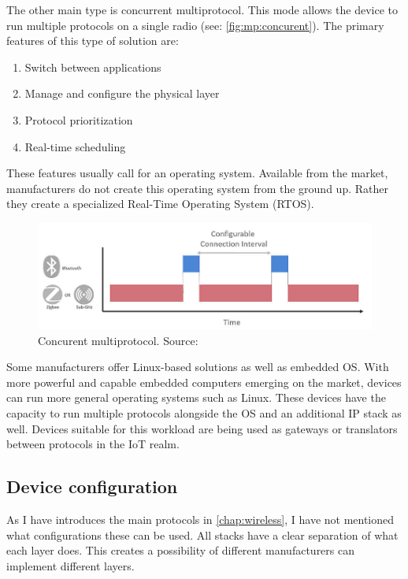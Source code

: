 The other main type is concurrent multiprotocol. This mode allows the device to run multiple protocols on a single radio (see: \autoref{fig:mp:concurent}). The primary features of this type of solution are:
\begin{enumerate}
    \item Switch between applications
    \item Manage and configure the physical layer
    \item Protocol prioritization
    \item Real-time scheduling
\end{enumerate}

These features usually call for an operating system. Available from the market, manufacturers do not create this operating system from the ground up. Rather they create a specialized Real-Time Operating System (RTOS).

\begin{figure}
    \centering
    \includegraphics[width=130mm, keepaspectratio]{figures/silabs-dynamic-multiprotocol-slicing-diagram.png}
    \caption{Concurent multiprotocol. Source: \cite{silabs:mp}}
    \label{fig:mp:concurent}
\end{figure}

Some manufacturers offer Linux-based solutions as well as embedded OS. With more powerful and capable embedded computers emerging on the market, devices can run more general operating systems such as Linux. These devices have the capacity to run multiple protocols alongside the OS and an additional IP stack as well. Devices suitable for this workload are being used as gateways or translators between protocols in the IoT realm.

\subsection{Device configuration}
\label{sec:multi:dc}
As I have introduces the main protocols in \autoref{chap:wireless}, I have not mentioned what configurations these can be used. All stacks have a clear separation of what each layer does. This creates a possibility of different manufacturers can implement different layers.

